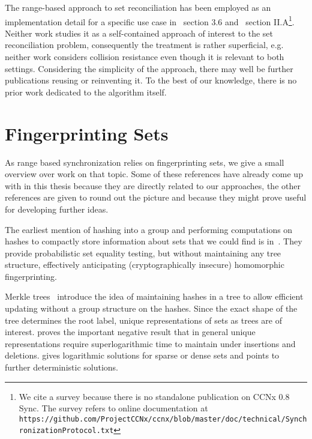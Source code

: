 
The range-based approach to set reconciliation has been employed as an implementation detail for a specific use case in~\cite{chen1999prototype} section 3.6 and~\cite{shang2017survey} section II.A\footnote{We cite a survey because there is no standalone publication on CCNx 0.8 Sync. The survey refers to online documentation at \texttt{https://github.com/ProjectCCNx/ccnx/blob/master/doc/technical/SynchronizationProtocol.txt}}. Neither work studies it as a self-contained approach of interest to the set reconciliation problem, consequently the treatment is rather superficial, e.g. neither work considers collision resistance even though it is relevant to both settings. Considering the simplicity of the approach, there may well be further publications reusing or reinventing it. To the best of our knowledge, there is no prior work dedicated to the algorithm itself.

\section{Fingerprinting Sets}

As range based synchronization relies on fingerprinting sets, we give a small overview over work on that topic. Some of these references have already come up with in this thesis because they are directly related to our approaches, the other references are given to round out the picture and because they might prove useful for developing further ideas.

The earliest mention of hashing into a group and performing computations on hashes to compactly store information about sets that we could find is in~\cite{wegman1981new}. They provide probabilistic set equality testing, but without maintaining any tree structure, effectively anticipating (cryptographically insecure) homomorphic fingerprinting.

Merkle trees~\cite{merkle1989certified} introduce the idea of maintaining hashes in a tree to allow efficient updating without a group structure on the hashes. Since the exact shape of the tree determines the root label, unique representations of sets as trees are of interest. \cite{uniquerepresentation} proves the important negative result that in general unique representations require superlogarithmic time to maintain under insertions and deletions. \cite{sundar1994unique} gives logarithmic solutions for sparse or dense sets and points to further deterministic solutions.


